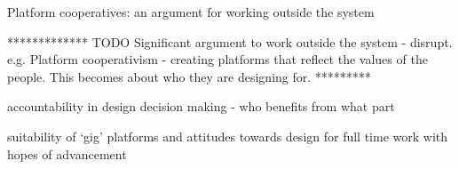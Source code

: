Platform cooperatives: an argument for working outside the system

************* TODO Significant argument to work outside the system - disrupt. e.g. Platform cooperativism - creating platforms that reflect the values of the people. This becomes about who they are designing for. *********

accountability in design decision making - who benefits from what part

suitability of `gig' platforms and attitudes towards design for full time work with hopes of advancement